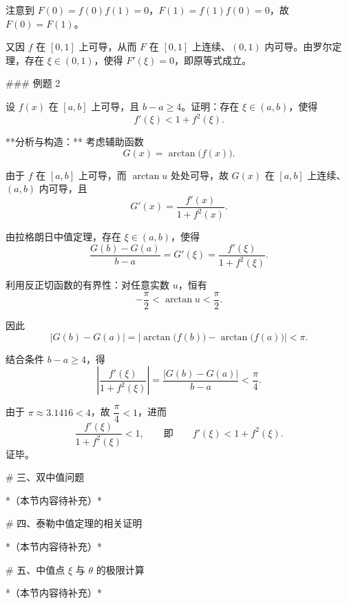 注意到 $F(0) = f(0)f(1) = 0$，$F(1) = f(1)f(0) = 0$，故 $F(0) = F(1)$。

又因 $f$ 在 $[0,1]$ 上可导，从而 $F$ 在 $[0,1]$ 上连续、$(0,1)$ 内可导。由罗尔定理，存在 $\xi \in (0,1)$，使得 $F'(\xi) = 0$，即原等式成立。

### 例题 2

设 $f(x)$ 在 $[a,b]$ 上可导，且 $b - a \geq 4$。证明：存在 $\xi \in (a,b)$，使得
$$
f'(\xi) < 1 + f^2(\xi).
$$

**分析与构造：** 考虑辅助函数
$$
G(x) = \arctan\bigl(f(x)\bigr).
$$

由于 $f$ 在 $[a,b]$ 上可导，而 $\arctan u$ 处处可导，故 $G(x)$ 在 $[a,b]$ 上连续、$(a,b)$ 内可导，且
$$
G'(x) = \frac{f'(x)}{1 + f^2(x)}.
$$

由拉格朗日中值定理，存在 $\xi \in (a,b)$，使得
$$
\frac{G(b) - G(a)}{b - a} = G'(\xi) = \frac{f'(\xi)}{1 + f^2(\xi)}.
$$

利用反正切函数的有界性：对任意实数 $u$，恒有
$$
-\frac{\pi}{2} < \arctan u < \frac{\pi}{2}.
$$

因此
$$
|G(b) - G(a)| = \bigl|\arctan\bigl(f(b)\bigr) - \arctan\bigl(f(a)\bigr)\bigr| < \pi.
$$

结合条件 $b - a \geq 4$，得
$$
\left|\frac{f'(\xi)}{1 + f^2(\xi)}\right|
= \frac{|G(b) - G(a)|}{b - a}
< \frac{\pi}{4}.
$$

由于 $\pi \approx 3.1416 < 4$，故 $\dfrac{\pi}{4} < 1$，进而
$$
\frac{f'(\xi)}{1 + f^2(\xi)} < 1,
\qquad\text{即}\qquad
f'(\xi) < 1 + f^2(\xi).
$$
证毕。

# 三、双中值问题

*（本节内容待补充）*

# 四、泰勒中值定理的相关证明

*（本节内容待补充）*

# 五、中值点 $\xi$ 与 $\theta$ 的极限计算

*（本节内容待补充）*
